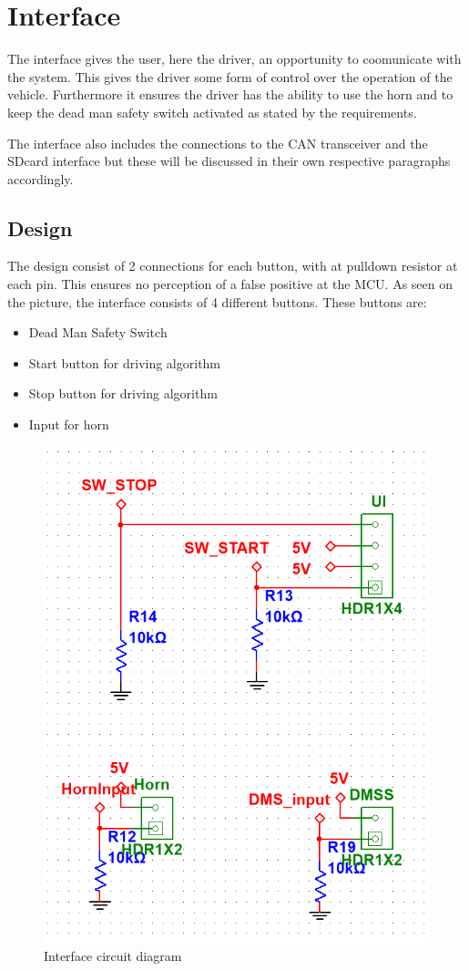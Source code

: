 \newpage
\section{Interface}
The interface gives the user, here the driver, an opportunity to coomunicate with the system. This gives the driver some form of control over the operation of the vehicle. Furthermore it ensures the driver has the ability to use the horn and to keep the dead man safety switch activated as stated by the requirements.

The interface also includes the  connections to the CAN transceiver and the SDcard interface but these will be discussed in their own respective paragraphs accordingly.  
\subsection{Design}

The design consist of 2 connections for each button, with at pulldown resistor at each pin. This ensures no perception of a false positive at the MCU. As seen on the picture, the interface consists of 4 different buttons. These buttons are:

\begin{itemize}
	\item{Dead Man Safety Switch}
	\item{Start button for driving algorithm}
	\item{Stop button for driving algorithm}
	\item{Input for horn}
\end{itemize}

\begin{figure}[H]
	\centering
	\includegraphics[width=0.6\linewidth]{Hardware/Pictures/User_interface}
	\caption{Interface circuit diagram}
	\label{fig:interface}
\end{figure}


